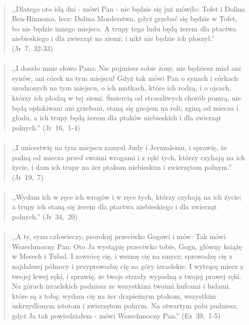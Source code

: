 \documentclass[10pt,a4paper,oneside]{article}
\begin{document}
\paragraph{}
\begin{quote}
,,Dlatego oto idą dni - mówi Pan - nie będzie się już mówiło: Tofet i Dolina Ben-Hinnoma, lecz: Dolina Morderstwa, gdyż grzebać się będzie w Tofet, bo nie będzie innego miejsca. A trupy tego ludu będą żerem dla ptactwa niebieskiego i dla zwierząt na ziemi; i nikt nie będzie ich płoszył.'' \mbox{(Jr 7, 32-33)}
\end{quote}
\paragraph{}
\begin{quote}
,,I doszło mnie słowo Pana: Nie pojmiesz sobie żony, nie będziesz miał ani synów, ani córek na tym miejscu! Gdyż tak mówi Pan o synach i córkach urodzonych na tym miejscu, o ich matkach, które ich rodzą, i o ojcach, którzy ich płodzą w tej ziemi. Śmiercią od straszliwych chorób pomrą, nie będą opłakiwani ani grzebani, staną się gnojem na roli; zginą od miecza i głodu, a ich trupy będą żerem dla ptaków niebieskich i dla zwierząt polnych.'' \mbox{(Jr 16, 1-4)}
\end{quote}
\paragraph{}
\begin{quote}
,,I unicestwię na tym miejscu zamysł Judy i Jeruzalemu, i sprawię, że padną od miecza przed swoimi wrogami i z ręki tych, którzy czyhają na ich życie, i dam ich trupy na żer ptakom niebieskim i zwierzętom polnym.'' \mbox{(Jr 19, 7)}
\end{quote}
\paragraph{}
\begin{quote}
,,Wydam ich w ręce ich wrogów i w ręce tych, którzy czyhają na ich życie; a trupy ich staną się żerem dla ptactwa niebieskiego i dla zwierząt polnych.'' \mbox{(Jr 34, 20)}
\end{quote}
\paragraph{}
\begin{quote}
,,A ty, synu człowieczy, prorokuj przeciwko Gogowi i mów: Tak mówi Wszechmocny Pan: Oto Ja wystąpię przeciwko tobie, Gogu, główny książę w Mesech i Tubal. I zawrócę cię, i wezmę cię na smycz; sprowadzę cię z najdalszej północy i przyprowadzę cię na góry izraelskie. I wytrącę miecz z twojej lewej ręki, i sprawię, że twoje strzały wypadną z twojej prawej ręki. Na górach izraelskich padniesz ze wszystkimi twoimi hufcami i ludami, które są z tobą; wydam cię na żer drapieżnym ptakom, wszystkim uskrzydlonym istotom i zwierzętom polnym. Na otwartym polu padniesz, gdyż Ja tak powiedziałem - mówi Wszechmocny Pan.'' \mbox{(Ez 39, 1-5)}
\end{quote}
\end{document}
